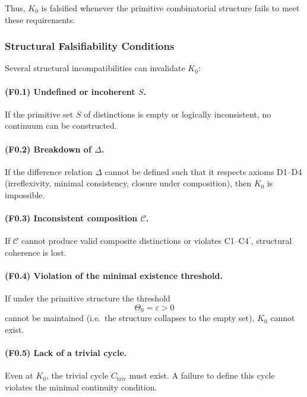 Thus, $K_0$ is falsified whenever the primitive combinatorial structure
fails to meet these requirements.



\subsubsection{Structural Falsifiability Conditions}

Several structural incompatibilities can invalidate $K_0$:

\paragraph{(F0.1) Undefined or incoherent \texorpdfstring{$S$}{S}.}  
If the primitive set $S$ of distinctions is empty or logically 
inconsistent, no continuum can be constructed.

\paragraph{(F0.2) Breakdown of \texorpdfstring{$\Delta$}{\Delta}.}  
If the difference relation $\Delta$ cannot be defined such that it 
respects axioms D1–D4 (irreflexivity, minimal consistency, closure
under composition), then $K_0$ is impossible.

\paragraph{(F0.3) Inconsistent composition $\mathcal{C}$.}  
If $\mathcal{C}$ cannot produce valid composite distinctions or violates 
C1–C4$^\prime$, structural coherence is lost.

\paragraph{(F0.4) Violation of the minimal existence threshold.}  
If under the primitive structure the threshold
\[
\Theta_0 = \varepsilon>0
\]
cannot be maintained (i.e.\ the structure collapses to the empty set),
$K_0$ cannot exist.

\paragraph{(F0.5) Lack of a trivial cycle.}  
Even at $K_0$, the trivial cycle $C_{\mathrm{triv}}$ must exist.
A failure to define this cycle violates the minimal continuity condition.


